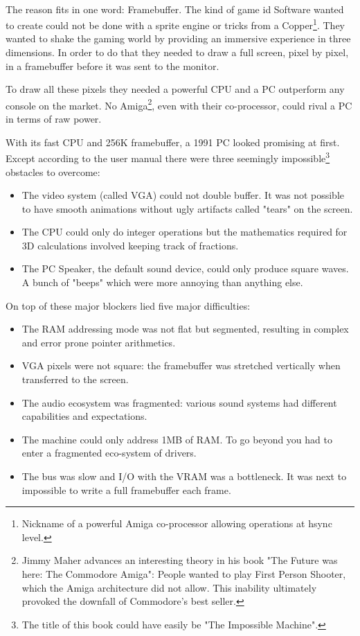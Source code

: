 \\
The reason fits in one word: Framebuffer. The kind of game id Software wanted to create could not be done with a sprite engine or tricks from a Copper\footnote{Nickname of a powerful Amiga co-processor allowing operations at hsync level.}. They wanted to shake the gaming world by providing an immersive experience in three dimensions. In order to do that they needed to draw a full screen, pixel by pixel, in a framebuffer before it was sent to the monitor. \\
\par
To draw all these pixels they needed a powerful CPU and a PC outperform any console on the market. No Amiga\footnote{Jimmy Maher advances an interesting theory in his book "The Future was here: The Commodore Amiga": People wanted to play First Person Shooter, which the Amiga architecture did not allow. This inability ultimately provoked the downfall of Commodore's best seller.}, even with their co-processor, could rival a PC in terms of raw power.
\par


 
With its fast CPU and 256K framebuffer, a 1991 PC looked promising at first. Except according to the user manual there were three seemingly impossible\footnote{The title of this book could have easily be "The Impossible Machine".} obstacles to overcome:\\
\begin{itemize}
\item The video system (called VGA) could not double buffer. It was not possible to have smooth animations without ugly artifacts called "tears" on the screen.
\item The CPU could only do integer operations but the mathematics required for 3D calculations involved keeping track of fractions.
\item The PC Speaker, the default sound device, could only produce square waves. A bunch of "beeps" which were more annoying than anything else.
\end{itemize}
On top of these major blockers lied five major difficulties:\\
\begin{itemize}
\item The RAM addressing mode was not flat but segmented, resulting in complex and error prone pointer arithmetics.
\item VGA pixels were not square: the framebuffer was stretched vertically when
transferred to the screen.
\item The audio ecosystem was fragmented: various sound systems had different capabilities and expectations.
\item The machine could only address 1MB of RAM. To go beyond you had to enter a fragmented eco-system of drivers.
\item The bus was slow and I/O with the VRAM was a bottleneck. It was next to impossible to write a full framebuffer each frame.
\end{itemize}

